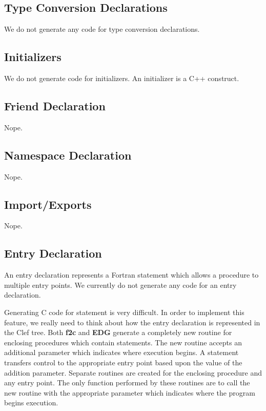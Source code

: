 \subsection{Type Conversion Declarations}

We do not generate any code for type conversion declarations.

\subsection{Initializers}

We do not generate code for initializers.  An initializer
is a C++ construct.

\subsection{Friend Declaration}

Nope.

\subsection{Namespace Declaration}

Nope.

\subsection{Import/Exports}

Nope.

\subsection{Entry Declaration}

An entry declaration represents a Fortran  statement which
allows a procedure to multiple entry points.  We currently do not
generate any code for an entry declaration.

Generating C code for  statement is very difficult.  In
order to implement this feature, we really need to think about how the
entry declaration is represented in the Clef tree.  Both \textbf{f2c}
and \textbf{EDG} generate a completely new routine for enclosing
procedures which contain  statements.  The new routine
accepts an additional parameter which indicates where execution
begins.  A  statement transfers control to the appropriate
entry point based upon the value of the addition parameter.
Separate routines are created for the enclosing procedure and
any entry point.  The only function performed by these routines
are to call the new routine with the appropriate parameter which
indicates where the program begins execution.

